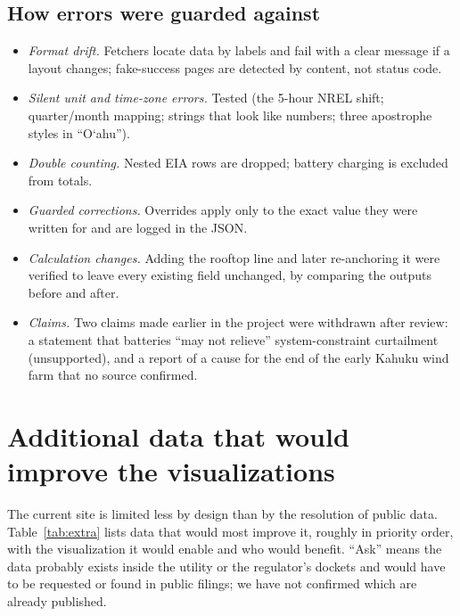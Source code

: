 \documentclass[11pt,a4paper]{article}
\newcommand{\okina}{\textquoteleft}
\newcommand{\Oahu}{\texorpdfstring{O\okina ahu}{Oahu}}
\begin{document}
\subsection{How errors were guarded against}
\begin{itemize}
\item \emph{Format drift.} Fetchers locate data by labels and fail with a clear message if a layout changes;
 fake-success pages are detected by content, not status code.
\item \emph{Silent unit and time-zone errors.} Tested (the 5-hour NREL shift; quarter/month mapping; strings that
 look like numbers; three apostrophe styles in ``\Oahu'').
\item \emph{Double counting.} Nested EIA rows are dropped; battery charging is excluded from totals.
\item \emph{Guarded corrections.} Overrides apply only to the exact value they were written for and are logged in the JSON.
\item \emph{Calculation changes.} Adding the rooftop line and later re-anchoring it were verified to leave every
 existing field unchanged, by comparing the outputs before and after.
\item \emph{Claims.} Two claims made earlier in the project were withdrawn after review: a statement that batteries
 ``may not relieve'' system-constraint curtailment (unsupported), and a report of a cause for the end of the early
 Kahuku wind farm that no source confirmed.
\end{itemize}

\section{Additional data that would improve the visualizations}
\label{sec:extra}

The current site is limited less by design than by the resolution of public data. Table~\ref{tab:extra} lists
data that would most improve it, roughly in priority order, with the visualization it would enable and who would
benefit. ``Ask'' means the data probably exists inside the utility or the regulator's dockets and would have to be
requested or found in public filings; we have not confirmed which are already published.
\end{document}
